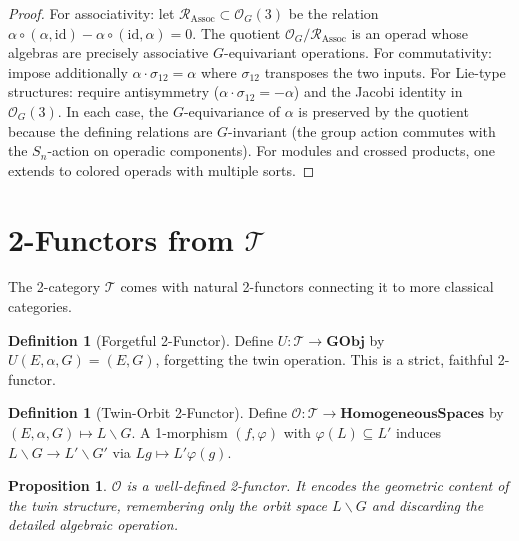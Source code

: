 \documentclass[11pt,a4paper,openany]{book}
\theoremstyle{plain}
\newtheorem{proposition}[theorem]{Proposition}
\theoremstyle{definition}
\newtheorem{definition}[theorem]{Definition}
\newcommand{\lingroup}{L}
\newcommand{\actspace}{E}
\newcommand{\groupG}{G}
\newcommand{\id}{\mathrm{id}}
\newcommand{\GObj}{\mathbf{GObj}}
\begin{document}
\begin{proof}
For associativity: let $\mathcal{R}_{\mathrm{Assoc}} \subset \mathcal{O}_\groupG(3)$ be the relation $\alpha \circ (\alpha, \id) - \alpha \circ (\id, \alpha) = 0$. The quotient $\mathcal{O}_\groupG / \mathcal{R}_{\mathrm{Assoc}}$ is an operad whose algebras are precisely associative $\groupG$-equivariant operations. For commutativity: impose additionally $\alpha \cdot \sigma_{12} = \alpha$ where $\sigma_{12}$ transposes the two inputs. For Lie-type structures: require antisymmetry ($\alpha \cdot \sigma_{12} = -\alpha$) and the Jacobi identity in $\mathcal{O}_\groupG(3)$. In each case, the $\groupG$-equivariance of $\alpha$ is preserved by the quotient because the defining relations are $\groupG$-invariant (the group action commutes with the $S_n$-action on operadic components). For modules and crossed products, one extends to colored operads with multiple sorts.
\end{proof}

\section{2-Functors from $\mathcal{T}$}

The 2-category $\mathcal{T}$ comes with natural 2-functors connecting it to more classical categories.

\begin{definition}[Forgetful 2-Functor]\label{def:forgetful-2functor}
Define $U : \mathcal{T} \to \GObj$ by $U(\actspace, \alpha, \groupG) = (\actspace, \groupG)$, forgetting the twin operation. This is a strict, faithful 2-functor.
\end{definition}

\begin{definition}[Twin-Orbit 2-Functor]\label{def:orbit-2functor}
Define $\mathcal{O} : \mathcal{T} \to \mathbf{HomogeneousSpaces}$ by $(\actspace, \alpha, \groupG) \mapsto \lingroup\backslash\groupG$. A 1-morphism $(f, \varphi)$ with $\varphi(\lingroup)\subseteq\lingroup'$ induces $\lingroup\backslash\groupG \to \lingroup'\backslash\groupG'$ via $\lingroup g \mapsto \lingroup'\varphi(g)$.
\end{definition}

\begin{proposition}\label{prop:orbit-2functor}
$\mathcal{O}$ is a well-defined 2-functor. It encodes the geometric content of the twin structure, remembering only the orbit space $\lingroup\backslash\groupG$ and discarding the detailed algebraic operation.
\end{proposition}
\end{document}
